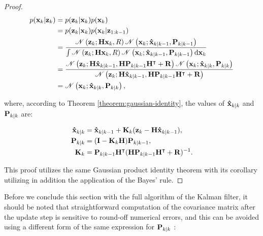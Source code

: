 \begin{proof}
    \begin{align}
        p(\vecat{x}{k} | \vecat{z}{k})
        &= p(\vecat{z}{k} | \vecat{x}{k}) p(\vecat{x}{k}) \\
        &= p(\vecat{z}{k} | \vecat{x}{k}) p(\vecat{x}{k} | \vecat{z}{1:k-1}) \\
        &= \frac{
            \mathscr{N}\left(\vecat{z}{k}; \mathbf{H} \vecat{x}{k}, R\right)
            \mathscr{N}\left(\vecat{x}{k}; \vecat{\hat{x}}{k|k-1}, \vecat{P}{k|k-1} \right)
        }{
            \int
            \mathscr{N}\left(\vecat{z}{k}; \mathbf{H} \vecat{x}{k}, R\right)
            \mathscr{N}\left(\vecat{x}{k}; \vecat{\hat{x}}{k|k-1}, \vecat{P}{k|k-1} \right)
            \mathrm{d} \vecat{x}{k}
        } \\
        &= \frac{
            \mathscr{N}\left(\vecat{z}{k}; \mathbf{H} \vecat{\hat{x}}{k|k-1}, \mathbf{H} \vecat{P}{k|k-1} \mathbf{H}^\intercal + \mathbf{R}\right)
            \mathscr{N}\left(\vecat{x}{k}; \vecat{\hat{x}}{k|k}, \vecat{P}{k|k} \right)
        }{
            \mathscr{N}\left(\vecat{z}{k}; \mathbf{H} \vecat{\hat{x}}{k|k-1}, \mathbf{H} \vecat{P}{k|k-1} \mathbf{H}^\intercal + \mathbf{R}\right)
        } \\
        &= \mathscr{N}\left(\vecat{x}{k}; \vecat{\hat{x}}{k|k}, \vecat{P}{k|k} \right),
    \end{align}

    where, according to Theorem \ref{theorem:gaussian-identity}, the values of $\vecat{\hat{x}}{k|k}$ and $\vecat{P}{k|k}$ are:

    \begin{align*}
        \vecat{\hat{x}}{k|k}
        &= \vecat{\hat{x}}{k|k-1} + \vecat{K}{k}(\vecat{z}{k} - \mathbf{H}\vecat{\hat{x}}{k|k-1}), \\
        \vecat{P}{k|k}
        &= (\mathbf{I} - \vecat{K}{k}\mathbf{H})\vecat{P}{k|k-1}, \\
        \vecat{K}{k} 
        &= \vecat{P}{k|k-1}\mathbf{H}^\intercal(\mathbf{H}\vecat{P}{k|k-1}\mathbf{H}^\intercal + \mathbf{R})^{-1}.
    \end{align*}

    This proof utilizes the same Gaussian product identity theorem with its corollary utilizing in addition the application of the Bayes' rule.
\end{proof}

Before we conclude this section with the full algorithm of the Kalman filter, it should be noted that straightforward computation of the covariance matrix after the update step is sensitive to round-off numerical errors, and this can be avoided using a different form of the same expression for $\vecat{P}{k|k}$ \cite{bar-shalomEstimationApplicationsTracking2001}:

